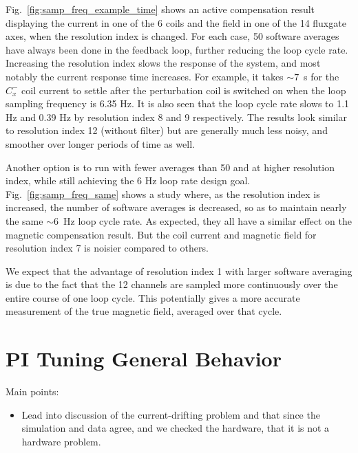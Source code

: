 Fig.~\ref{fig:samp_freq_example_time} shows an active compensation
result displaying the current in one of the 6 coils and the field in
one of the 14 fluxgate axes, when the resolution index is changed.
For each case, 50 software averages have always been done in the
feedback loop, further reducing the loop cycle rate.  Increasing the
resolution index slows the response of the system, and most notably
the current response time increases.  For example, it takes $\sim 7$~s
for the $C_x^-$ coil current to settle after the perturbation coil is
switched on when the loop sampling frequency is 6.35 Hz. It is also
seen that the loop cycle rate slows to 1.1 Hz and 0.39 Hz by
resolution index 8 and 9 respectively.  The results look similar to
resolution index 12 (without filter) but are generally much less
noisy, and smoother over longer periods of time as well.



Another option is to run with fewer averages than 50 and at higher
resolution index, while still achieving the 6 Hz loop rate design
goal.  Fig.~\ref{fig:samp_freq_same} shows a study where, as the
resolution index is increased, the number of software averages is
decreased, so as to maintain nearly the same $\sim 6$~Hz loop cycle
rate.  As expected, they all have a similar effect on the magnetic
compensation result.  But the coil current and magnetic field for
resolution index 7 is noisier compared to others. 

We expect that the advantage of resolution index 1 with larger
software averaging is due to the fact that the 12 channels are sampled
more continuously over the entire course of one loop cycle.  This
potentially gives a more accurate measurement of the true magnetic
field, averaged over that cycle.


% 

\section{PI Tuning General Behavior}\label{sec:pi_behave}
Main points:
\begin{itemize}
\item Lead into discussion of the current-drifting problem and that since the simulation and data agree, and we checked the hardware, that it is not a hardware problem.
\end{itemize}

